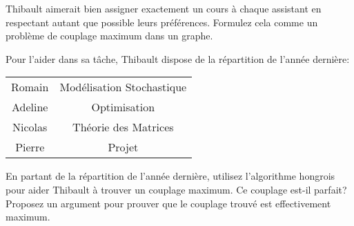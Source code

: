 Thibault aimerait bien assigner exactement un cours à chaque assistant en respectant autant que possible leurs préférences. Formulez cela comme un problème de couplage maximum dans un graphe.

Pour l'aider dans sa tâche, Thibault dispose de la répartition de l'année dernière:

\begin{center}
  \begin{tabular}{|c|c|}
    \hline
    Romain & Modélisation Stochastique \\
    Adeline & Optimisation \\
    Nicolas & Théorie des Matrices \\
    Pierre & Projet \\
    \hline
  \end{tabular}
\end{center}

En partant de la répartition de l'année dernière, utilisez l'algorithme hongrois pour aider Thibault à trouver un couplage maximum. Ce couplage est-il parfait? Proposez un argument pour prouver que le couplage trouvé est effectivement maximum.

